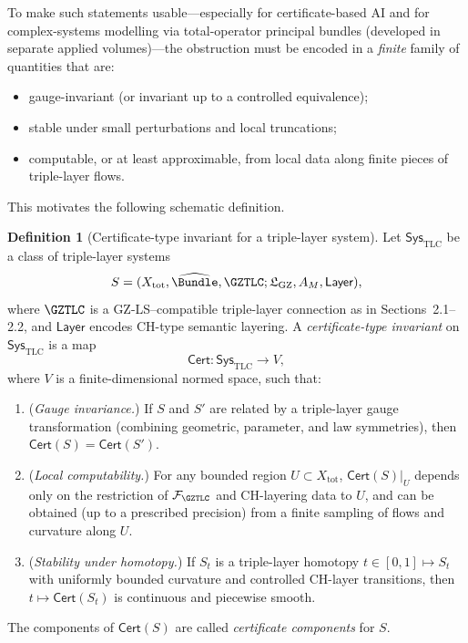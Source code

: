 \documentclass[11pt]{book}
\theoremstyle{plain}
\theoremstyle{definition}
\newtheorem{definition}[theorem]{Definition} \theoremstyle{remark}
\newcommand{\GZLS}{\ensuremath{\mathfrak{L}_{\mathrm{GZ}}}}       \newcommand{\GZLT}{\ensuremath{M_{!w}}}                           \newcommand{\GZLOC}{\ensuremath{A_M}}                             \newcommand{\GZLCurv}{\ensuremath{\mathcal{F}_{\mathrm{law}}}}
\begin{document}
To make such statements usable—especially for certificate-based AI and for
complex-systems modelling via total-operator principal bundles (developed in
separate applied volumes)—the obstruction must be encoded in a
  \emph{finite} family of quantities that are:

\begin{itemize}
  \item gauge-invariant (or invariant up to a controlled equivalence);
  \item stable under small perturbations and local truncations;
  \item computable, or at least approximable, from local data along
        finite pieces of triple-layer flows.
\end{itemize}

This motivates the following schematic definition.

\begin{definition}[Certificate-type invariant for a triple-layer system]
Let $\mathsf{Sys}_{\mathrm{TLC}}$ be a class of triple-layer systems
  \[
     S =
     (X_{\mathrm{tot}},
      \widehat{\Bundle},\GZTLC;
      \GZLS,\GZLOC,\mathsf{Layer}),
  \]
  where $\GZTLC$ is a GZ-LS–compatible triple-layer connection as in
  Sections~2.1–2.2, and $\mathsf{Layer}$ encodes CH-type semantic
  layering. A \emph{certificate-type invariant} on
  $\mathsf{Sys}_{\mathrm{TLC}}$ is a map
  \[
     \mathsf{Cert}:
       \mathsf{Sys}_{\mathrm{TLC}}
       \longrightarrow
       V,
  \]
  where $V$ is a finite-dimensional normed space, such that:
  \begin{enumerate}[label=\roman*)]
    \item (\emph{Gauge invariance.})
          If $S$ and $S'$ are related by a triple-layer gauge
          transformation (combining geometric, parameter, and law
          symmetries), then $\mathsf{Cert}(S)=\mathsf{Cert}(S')$.
    \item (\emph{Local computability.})
          For any bounded region $U\subset X_{\mathrm{tot}}$,
          $\mathsf{Cert}(S)|_U$ depends only on the restriction of
          $\mathcal{F}_{\GZTLC}$ and CH-layering data to $U$, and
          can be obtained (up to a prescribed precision) from a finite
          sampling of flows and curvature along $U$.
    \item (\emph{Stability under homotopy.})
          If $S_t$ is a triple-layer homotopy
          $t\in[0,1]\mapsto S_t$ with uniformly bounded
          curvature and controlled CH-layer transitions, then
          $t\mapsto\mathsf{Cert}(S_t)$ is continuous and piecewise
          smooth.
  \end{enumerate}
  The components of $\mathsf{Cert}(S)$ are called \emph{certificate
  components} for $S$.
\end{definition}
\end{document}
